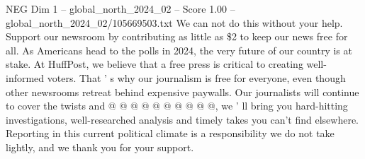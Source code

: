 \begin{textsample}{NEG Dim 1 – global\_north\_2024\_02 – Score 1.00 – global\_north\_2024\_02/105669503.txt}
We can not do this without your help.
Support our newsroom by contributing as little as \$2 to keep our news free for all.
As Americans head to the polls in 2024, the very future of our country is at stake.
At HuffPost, we believe that a free press is critical to creating well-informed voters.
That ' s why our journalism is free for everyone, even though other newsrooms retreat behind expensive paywalls.
Our journalists will continue to cover the twists and @ @ @ @ @ @ @ @ @ @, we ' ll bring you hard-hitting investigations, well-researched analysis and timely takes you can't find elsewhere.
Reporting in this current political climate is a responsibility we do not take lightly, and we thank you for your support.

\end{textsample}
